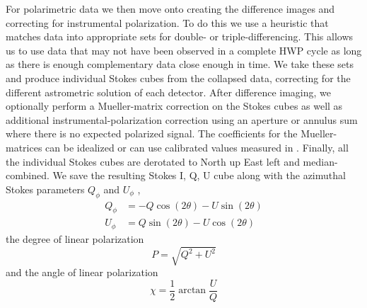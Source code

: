 For polarimetric data we then move onto creating the difference images and correcting for instrumental polarization. To do this we use a heuristic that matches data into appropriate sets for double- or triple-differencing. This allows us to use data that may not have been observed in a complete HWP cycle as long as there is enough complementary data close enough in time. We take these sets and produce individual Stokes cubes from the collapsed data, correcting for the different astrometric solution of each detector. After difference imaging, we optionally perform a Mueller-matrix correction on the Stokes cubes as well as additional instrumental-polarization correction using an aperture or annulus sum where there is no expected polarized signal. The coefficients for the Mueller-matrices can be idealized or can use calibrated values measured in \citet{zhang_characterizing_2023}. Finally, all the individual Stokes cubes are derotated to North up East left and median-combined. We save the resulting Stokes I, Q, U cube along with the azimuthal Stokes parameters $Q_\phi$ and $U_\phi$ \citep{monnier_multiple_2019}, 
\begin{align}
    \label{eqn:radial_stokes}
    Q_\phi &= -Q\cos{\left(2\theta\right)} - U\sin{\left(2\theta\right)} \\
    U_\phi &= Q\sin{\left(2\theta\right)} - U\cos{\left(2\theta\right)}
\end{align}
the degree of linear polarization
\begin{equation}
    P = \sqrt{Q^2 + U^2}
\end{equation}
and the angle of linear polarization
\begin{equation}
    \chi = \frac12\arctan{\frac{U}{Q}}
\end{equation}